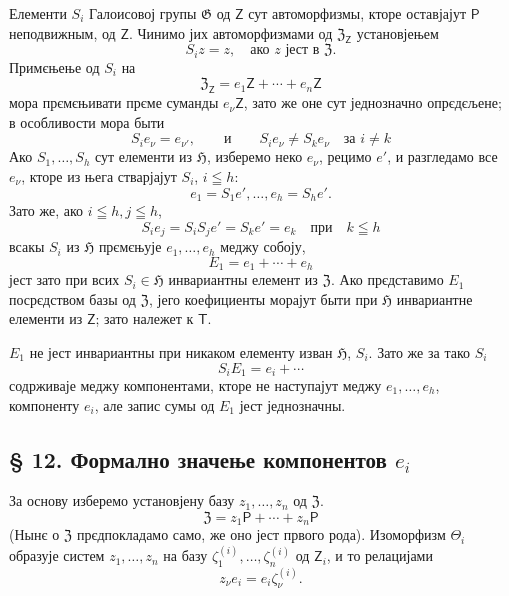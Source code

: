 \documentclass[11pt]{article}
\begin{document}
Елементи \(S_i\) Галоисовој групы \(\mathfrak G\) од \(\mathsf Z\) сут автоморфизмы, кторе оставјајут \(\mathsf P\) неподвижным, од \(\mathsf Z\). Чинимо јих автоморфизмами од \(\mathfrak Z_{\mathsf Z}\) установјењем
\[
S_i z=z,\quad \text{ако } z \text{ јест в } \mathfrak Z.
\]
Примєњење од \(S_i\) на
\[
\mathfrak Z_{\mathsf Z}=e_1\mathsf Z+\cdots+e_n\mathsf Z
\]
мора прємєњивати прєме суманды \(e_\nu\mathsf Z\), зато же оне сут једнозначно опрєдєљене; в особливости мора быти
\[
S_i e_\nu=e_{\nu'},\qquad\text{и}\qquad S_i e_\nu\ne S_k e_\nu
\quad\text{за } i\ne k
\]
Ако \(S_1,\ldots,S_h\) сут елементи из \(\mathfrak H\), изберемо неко \(e_\nu\), рецимо \(e'\), и разгледамо все \(e_\nu\), кторе из њега стварјајут \(S_i\), \(i\leqq h\):
\[
e_1=S_1e',\ldots,e_h=S_he'.
\]
Зато же, ако \(i\leqq h, j\leqq h\),
\[
S_i e_j=S_iS_j e'=S_ke'=e_k \quad \text{при}\quad k\leqq h
\]
всакы \(S_i\) из \(\mathfrak H\) прємєњује \(e_1,\ldots,e_h\) меджу собоју,
\[
E_1=e_1+\cdots+e_h
\]
јест зато при всих \(S_i\in\mathfrak H\) инвариантны елемент из \(\mathfrak Z\). Ако прєдставимо \(E_1\) посрєдством базы од \(\mathfrak Z\), јего коефициенты морајут быти при \(\mathfrak H\) инвариантне елементи из \(\mathsf Z\); зато належет к \(\mathsf T\).

\(E_1\) не јест инвариантны при никаком елементу изван \(\mathfrak H\), \(S_i\). Зато же за тако \(S_i\)
\[
S_i E_1=e_i+\cdots
\]
содрживаје меджу компонентами, кторе не наступајут меджу \(e_1,\ldots,e_h\), компоненту \(e_i\), але запис сумы од \(E_1\) јест једнозначны.

\subsection*{§ 12. Формално значење компонентов \(e_i\)}\label{die-formale-bedeutung-der-komponenten-ei}

За основу изберемо установјену базу \(z_1,\ldots,z_n\) од \(\mathfrak Z\).
\[
\mathfrak Z=z_1\mathsf P+\cdots+z_n\mathsf P
\]
(Нынє о \(\mathfrak Z\) прєдпокладамо само, же оно јест првого рода). Изоморфизм \(\Theta_i\) образује систем \(z_1,\ldots,z_n\) на базу \(\zeta_1^{(i)},\ldots,\zeta_n^{(i)}\) од \(\mathsf Z_i\), и то релацијами
\[
z_\nu e_i=e_i\zeta_\nu^{(i)} .
\]
\end{document}
